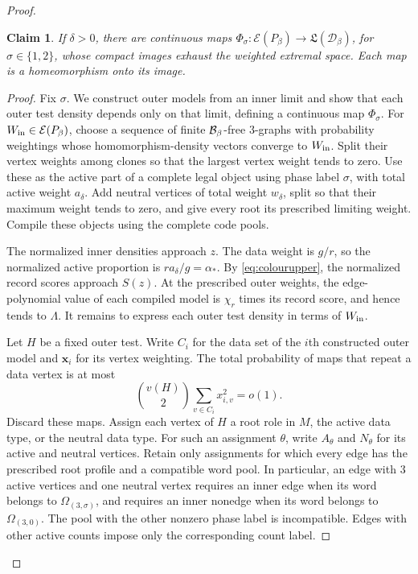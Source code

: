 \documentclass[10pt]{article}
\numberwithin{equation}{section}
\newtheorem{claim}[claim]{Claim}\aliascntresetthe{claim}
\theoremstyle{definition}
\newcommand{\cD}{\mathcal D}\newcommand{\cE}{\mathcal E}\newcommand{\cF}{\mathcal F}
\newcommand{\x}{\boldsymbol{x}}\newcommand{\y}{\boldsymbol{y}}
\begin{document}
\begin{proof}
\begin{claim}\label{clm:phasemaps}
If $\delta>0$, there are continuous maps $\Phi_\sigma\colon\cE(P_\beta)\to\mathfrak L(\cD_\beta)$, for $\sigma\in\{1,2\}$, whose compact images exhaust the weighted extremal space. Each map is a homeomorphism onto its image.
\end{claim}
\begin{proof}
Fix $\sigma$. We construct outer models from an inner limit and show that each outer test density depends only on that limit, defining a continuous map $\Phi_\sigma$. For $W_{\rm in}\in\cE(P_\beta)$, choose a sequence of finite $\mathcal B_\beta$-free $3$-graphs with probability weightings whose homomorphism-density vectors converge to $W_{\rm in}$. Split their vertex weights among clones so that the largest vertex weight tends to zero. Use these as the active part of a complete legal object using phase label $\sigma$, with total active weight $a_\delta$. Add neutral vertices of total weight $w_\delta$, split so that their maximum weight tends to zero, and give every root its prescribed limiting weight. Compile these objects using the complete code pools.

The normalized inner densities approach $z$. The data weight is $g/r$, so the normalized active proportion is $ra_\delta/g=\alpha_*$. By \eqref{eq:colourupper}, the normalized record scores approach $S(z)$. At the prescribed outer weights, the edge-polynomial value of each compiled model is $\chi_r$ times its record score, and hence tends to $\Lambda$. It remains to express each outer test density in terms of $W_{\rm in}$.

Let $H$ be a fixed outer test. Write $C_i$ for the data set of the $i$th constructed outer model and $\x_i$ for its vertex weighting. The total probability of maps that repeat a data vertex is at most
\[
 \binom{v(H)}2\sum_{v\in C_i}x_{i,v}^2=o(1).
\]
Discard these maps. Assign each vertex of $H$ a root role in $M$, the active data type, or the neutral data type. For such an assignment $\theta$, write $A_\theta$ and $N_\theta$ for its active and neutral vertices. Retain only assignments for which every edge has the prescribed root profile and a compatible word pool. In particular, an edge with $3$ active vertices and one neutral vertex requires an inner edge when its word belongs to $\Omega_{(3,\sigma)}$, and requires an inner nonedge when its word belongs to $\Omega_{(3,0)}$. The pool with the other nonzero phase label is incompatible. Edges with other active counts impose only the corresponding count label.


\end{proof}
\end{proof}
\end{document}

